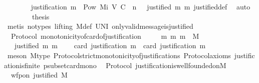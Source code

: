 \begin{isabellebody}
\ \ \ \ \ \ \isamarkupfalse%
\ {\isacartoucheopen}justification\ m\ {\isasymin}\ Pow\ {\isacharparenleft}Mi\ {\isacharparenleft}V{\isacharcomma}\ C{\isacharcomma}\ {\isasymepsilon}{\isacharparenright}\ {\isacharparenleft}n\ {\isacharminus}\ {}{\isacharparenright}{\isacharparenright}{\isacartoucheclose}\ {\isacartoucheopen}justified\ m{\isacharprime}\ m{\isacartoucheclose}\ justified{\isacharunderscore}def\ \isamarkupfalse%
\ auto\isanewline
\ \ \isamarkupfalse%
\isanewline
\ \ \isamarkupfalse%
\ \isamarkupfalse%
\ {\isacharquery}thesis\isanewline
\ \ \ \ \isamarkupfalse%
\ {\isacharparenleft}metis\ {\isacharparenleft}no{\isacharunderscore}types{\isacharcomma}\ lifting{\isacharparenright}\ M{\isacharunderscore}def\ UN{\isacharunderscore}I\ only{\isacharunderscore}valid{\isacharunderscore}message{\isacharunderscore}is{\isacharunderscore}justified{\isacharparenright}\isanewline
{}\isamarkupfalse%
%
\endisatagproof
{\isafoldproof}%
%
\isadelimproof
\ \ \isanewline
%
\endisadelimproof
\isanewline
{}\isamarkupfalse%
\ {\isacharparenleft}\ Protocol{\isacharparenright}\ monotonicity{\isacharunderscore}of{\isacharunderscore}card{\isacharunderscore}of{\isacharunderscore}justification\ {\isacharcolon}\ \isanewline
\ \ {\isachardoublequoteopen}{\isasymforall}\ m\ m{\isacharprime}{\isachardot}\ m\ {\isasymin}\ M\ \isanewline
\ \ {\isasymlongrightarrow}\ justified\ m{\isacharprime}\ m\ \isanewline
\ \ {\isasymlongrightarrow}\ card\ {\isacharparenleft}justification\ m{\isacharprime}{\isacharparenright}\ {\isacharless}\ card\ {\isacharparenleft}justification\ m{\isacharparenright}{\isachardoublequoteclose}\isanewline
%
\isadelimproof
\ \ %
\endisadelimproof
%
\isatagproof
{}\isamarkupfalse%
\ {\isacharparenleft}meson\ M{\isacharunderscore}type\ Protocol{\isachardot}strict{\isacharunderscore}monotonicity{\isacharunderscore}of{\isacharunderscore}justifications\ Protocol{\isacharunderscore}axioms\ justification{\isacharunderscore}is{\isacharunderscore}finite\ psubset{\isacharunderscore}card{\isacharunderscore}mono{\isacharparenright}%
\endisatagproof
{\isafoldproof}%
%
\isadelimproof
\isanewline
%
\endisadelimproof
\isanewline
\isanewline
{}\isamarkupfalse%
\ {\isacharparenleft}\ Protocol{\isacharparenright}\ justification{\isacharunderscore}is{\isacharunderscore}well{\isacharunderscore}founded{\isacharunderscore}on{\isacharunderscore}M\ {\isacharcolon}\isanewline
\ \ {\isachardoublequoteopen}wfp{\isacharunderscore}on\ justified\ M{\isachardoublequoteclose}\isanewline

\end{isabellebody}
